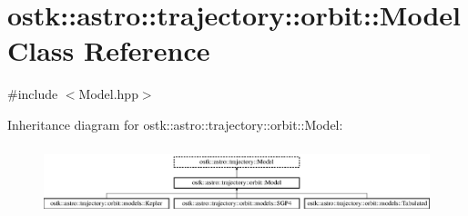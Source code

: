 \hypertarget{classostk_1_1astro_1_1trajectory_1_1orbit_1_1_model}{}\section{ostk\+:\+:astro\+:\+:trajectory\+:\+:orbit\+:\+:Model Class Reference}
\label{classostk_1_1astro_1_1trajectory_1_1orbit_1_1_model}


{\ttfamily \#include $<$Model.\+hpp$>$}

Inheritance diagram for ostk\+:\+:astro\+:\+:trajectory\+:\+:orbit\+:\+:Model\+:\begin{figure}[H]
\begin{center}
\leavevmode
\includegraphics[height=2.051282cm]{classostk_1_1astro_1_1trajectory_1_1orbit_1_1_model}
\end{center}
\end{figure}
